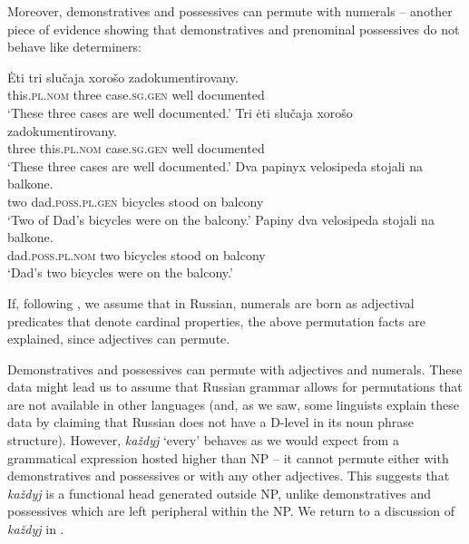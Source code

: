 \documentclass[output=paper,
colorlinks,
citecolor=brown,
newtxmath
]{langscibook}
\begin{document}
Moreover, demonstratives and possessives can permute with numerals -- another piece of evidence showing that demonstratives and prenominal possessives do not behave like determiners:


\ea
    \ea \gll Ėti tri slučaja xorošo zadokumentirovany.\\
    this.\textsc{pl.nom} three case.\textsc{sg.gen} well documented\\
    \glt `These three cases are well documented.'
    \ex \gll Tri ėti slučaja xorošo zadokumentirovany.\\
    three this.\textsc{pl.nom} case.\textsc{sg.gen} well documented\\
    \glt `These three cases are well documented.'
\z\ex
    \ea \gll Dva papinyx velosipeda stojali na balkone.\\
    two dad.\textsc{poss.pl.gen} bicycles stood on balcony\\
    \glt `Two of Dad's bicycles were on the balcony.'
    \ex \gll Papiny dva velosipeda stojali na balkone.\\
    dad.\textsc{poss.pl.nom} two bicycles stood on balcony\\
    \glt `Dad's two bicycles were on the balcony.'
\z\z

\noindent If, following \citet{Khrizman2016}, we assume that in Russian, numerals are born as adjectival predicates that denote cardinal properties, the above permutation facts are explained, since adjectives can permute.

Demonstratives and possessives can permute with adjectives and numerals. These data might lead us to assume that Russian grammar allows for permutations that are not available in other languages (and, as we saw, some linguists explain these data by claiming that Russian does not have a D-level in its noun phrase structure). However, \textit{každyj} `every' behaves as we would expect from a grammatical expression hosted higher than NP -- it cannot permute either with demonstratives and possessives or with any other adjectives. This suggests that \textit{každyj} is a functional head generated outside NP, unlike demonstratives and possessives which are left peripheral within the NP. We return to a discussion of \textit{každyj} in .


\ea
\z\z
\end{document}
